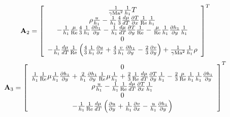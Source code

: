 \begin{equation*}
  {\bf{A}}_2  = \left[ {\begin{array}{*{20}c}
   {\frac{1}{{\gamma {\rm{Ma}}^2 }}\frac{1}{{h_1 }}T}  \\
   {\rho \frac{u}{{h_1 }} - \frac{1}{{h_1 }}\frac{4}{3}\frac{{d\mu }}{{dT}}\frac{{\partial T}}{{\partial x}}\frac{1}{{{\mathop{\rm Re}\nolimits} }}\frac{1}{{h_1 }}}  \\
   { - \frac{1}{{h_1 }}\frac{\mu }{{{\mathop{\rm Re}\nolimits} }}\frac{4}{3}\frac{1}{{h_1 }}\frac{{\partial h_1 }}{{\partial y}} - \frac{1}{{h_1 }}\frac{{d\mu }}{{dT}}\frac{{\partial T}}{{\partial y}}\frac{1}{{{\mathop{\rm Re}\nolimits} }} - \frac{\mu }{{{\mathop{\rm Re}\nolimits} }}\frac{1}{{h_1 }}\frac{{\partial h_1 }}{{\partial y}}\frac{1}{{h_1 }}}  \\
   0  \\
   { - \frac{1}{{h_1 }}\frac{{d\mu }}{{dT}}\frac{1}{{{\mathop{\rm Re}\nolimits} }}\left( {\frac{4}{3}\frac{1}{{h_1 }}\frac{{\partial u}}{{\partial x}} + \frac{4}{3}\frac{v}{{h_1 }}\frac{{\partial h_1 }}{{\partial y}} - \frac{2}{3}\frac{{\partial v}}{{\partial y}}} \right) + \frac{1}{{\gamma {\rm{Ma}}^2 }}\frac{1}{{h_1 }}\rho }  \\
\end{array}} \right]^T
\end{equation*}
\begin{equation*}
  {\bf{A}}_3  = \left[ {\begin{array}{*{20}c}
   0  \\
   {\frac{1}{{h_1 }}\frac{1}{{{\mathop{\rm Re}\nolimits} }}\mu \frac{1}{{h_1 }}\frac{{\partial h_1 }}{{\partial y}} + \frac{2}{{h_1 }}\frac{{\partial h_1 }}{{\partial y}}\frac{1}{{{\mathop{\rm Re}\nolimits} }}\mu \frac{1}{{h_1 }} + \frac{2}{3}\frac{1}{{{\mathop{\rm Re}\nolimits} }}\frac{{d\mu }}{{dT}}\frac{{\partial T}}{{\partial y}}\frac{1}{{h_1 }} - \frac{2}{3}\frac{\mu }{{{\mathop{\rm Re}\nolimits} }}\frac{1}{{h_1 }}\frac{1}{{h_1 }}\frac{{\partial h_1 }}{{\partial y}}}  \\
   {\rho \frac{u}{{h_1 }} - \frac{1}{{h_1 }}\frac{1}{{{\mathop{\rm Re}\nolimits} }}\frac{{d\mu }}{{dT}}\frac{{\partial T}}{{\partial x}}\frac{1}{{h_1 }}}  \\
   0  \\
   { - \frac{1}{{h_1 }}\frac{1}{{{\mathop{\rm Re}\nolimits} }}\frac{{d\mu }}{{dT}}\left( {\frac{{\partial u}}{{\partial y}} + \frac{1}{{h_1 }}\frac{{\partial v}}{{\partial x}} - \frac{u}{{h_1 }}\frac{{\partial h_1 }}{{\partial y}}} \right)}  \\
\end{array}} \right]^T
\end{equation*} 

